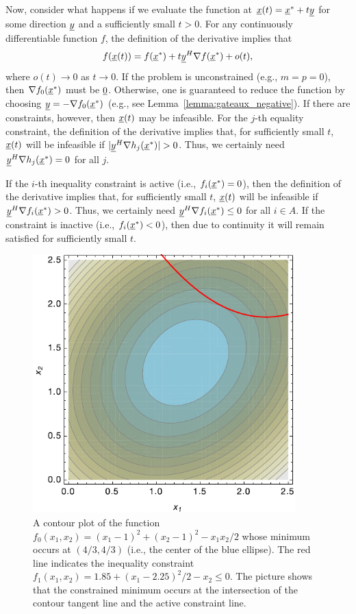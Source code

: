 Now, consider what happens if we evaluate the function at $\underline{x}(t) = \underline{x}^* + t \underline{y}$ for some direction $\underline{y}$ and a sufficiently small $t>0$.
For any continuously differentiable function $f$, the definition of the derivative implies that
\[ f(\underline{x}(t)) = f(\underline{x}^*)+t \underline{y}^H \nabla f(\underline{x}^*)+ o(t), \]
where $o(t) \to 0$ as $t \to 0$.
If the problem is unconstrained (e.g., $m=p=0$), then $\nabla f_0 (\underline{x}^*)$ must be $\underline{0}$.
Otherwise, one is guaranteed to reduce the function by choosing $\underline{y}=-\nabla f_0 (\underline{x}^*)$ (e.g., see Lemma~\ref{lemma:gateaux_negative}).
If there are constraints, however, then $\underline{x}(t)$ may be infeasible.
For the $j$-th equality constraint, the definition of the derivative implies that, for sufficiently small $t$, $\underline{x}(t)$ will be infeasible if $|\underline{y}^H \nabla h_j (\underline{x}^*)| > 0$.
Thus, we certainly need $\underline{y}^H \nabla h_j (\underline{x}^*) = 0$ for all $j$.

If the $i$-th inequality constraint is active (i.e., $f_i (\underline{x}^*)=0$), then the definition of the derivative implies that, for sufficiently small $t$, $\underline{x}(t)$ will be infeasible if $\underline{y}^H \nabla f_i (\underline{x}^*) > 0$.
Thus, we certainly need $\underline{y}^H \nabla f_i (\underline{x}^*) \leq 0$ for all $i\in A$. 
If the constraint is inactive (i.e., $f_i (\underline{x}^*)<0$), then due to continuity it will remain satisfied for sufficiently small $t$.

\begin{figure}[t]
  \begin{center}
    \includegraphics[width=4in]{opt_fig}
  \end{center}
  \caption{A contour plot of the function $f_0 (x_1,x_2) = (x_1 - 1)^2 + (x_2 - 1)^2 - x_1 x_2 /2$ whose minimum occurs at $(4/3,4/3)$ (i.e., the center of the blue ellipse).  The red line indicates the inequality constraint $f_1 (x_1,x_2)= 1.85 + (x_1 - 2.25)^2 / 2 - x_2 \leq 0$. The picture shows that the constrained minimum occurs at the intersection of the contour tangent line and the active constraint line.}
\end{figure}

